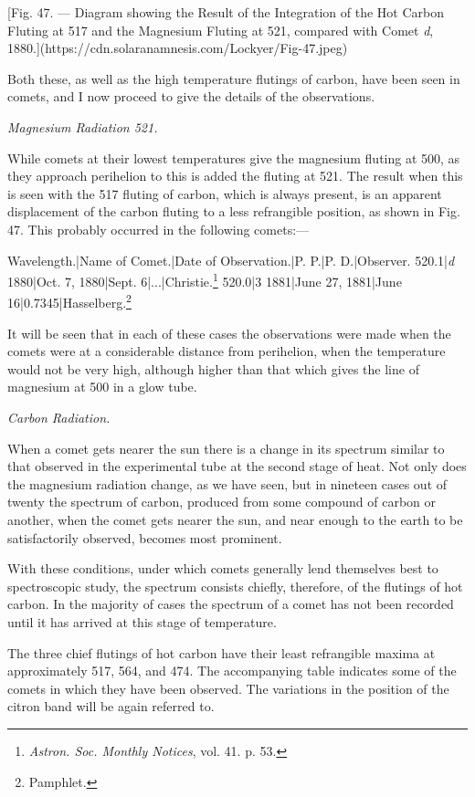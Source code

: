\documentclass[a4paper, 12pt, oneside, polutonikogreek, english]{article}
\begin{document}
[Fig. 47. --- Diagram showing the Result of the Integration of the Hot Carbon Fluting at 517 and the Magnesium Fluting at 521, compared with Comet \emph{d}, 1880.](https://cdn.solaranamnesis.com/Lockyer/Fig-47.jpeg)

Both these, as well as the high temperature flutings of carbon, have been seen in comets, and I now proceed to give the details of the observations.

\emph{Magnesium Radiation 521.}

While comets at their lowest temperatures give the magnesium fluting at 500, as they approach perihelion to this is added the fluting at 521. The result when this is seen with the 517 fluting of carbon, which is always present, is an apparent displacement of the carbon fluting to a less refrangible position, as shown in Fig. 47. This probably occurred in the following comets:---

Wavelength.|Name of Comet.|Date of Observation.|P. P.|P. D.|Observer. 
520.1|\emph{d} 1880|Oct. 7, 1880|Sept. 6|...|Christie.\footnote{\emph{Astron. Soc. Monthly Notices}, vol. 41. p. 53.} 
520.0|3 1881|June 27, 1881|June 16|0.7345|Hasselberg.\footnote{Pamphlet.}

It will be seen that in each of these cases the observations were made when the comets were at a considerable distance from perihelion, when the temperature would not be very high, although higher than that which gives the line of magnesium at 500 in a glow tube.

\emph{Carbon Radiation.}

When a comet gets nearer the sun there is a change in its spectrum similar to that observed in the experimental tube at the second stage of heat. Not only does the magnesium radiation change, as we have seen, but in nineteen cases out of twenty the spectrum of carbon, produced from some compound of carbon or another, when the comet gets nearer the sun, and near enough to the earth to be satisfactorily observed, becomes most prominent.

With these conditions, under which comets generally lend themselves best to spectroscopic study, the spectrum consists chiefly, therefore, of the flutings of hot carbon. In the majority of cases the spectrum of a comet has not been recorded until it has arrived at this stage of temperature.

The three chief flutings of hot carbon have their least refrangible maxima at approximately 517, 564, and 474. The accompanying table indicates some of the comets in which they have been observed. The variations in the position of the citron band will be again referred to.
\end{document}
